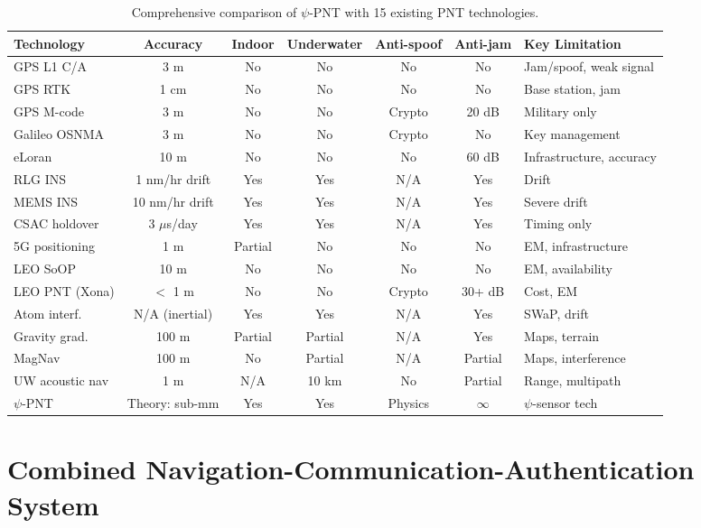 \documentclass[twocolumn,superscriptaddress,prd,nofootinbib]{revtex4-2}
\begin{document}
\begin{table}[t]
\centering
\caption{Comprehensive comparison of $\psi$-PNT with 15 existing PNT
technologies.}
\label{tab:pnt-compare}
\begin{ruledtabular}
\begin{tabular}{lcccccl}
Technology & Accuracy & Indoor & Underwater & Anti-spoof & Anti-jam & Key Limitation \\
\hline
GPS L1 C/A & 3 m & No & No & No & No & Jam/spoof, weak signal \\
GPS RTK & 1 cm & No & No & No & No & Base station, jam \\
GPS M-code & 3 m & No & No & Crypto & 20 dB & Military only \\
Galileo OSNMA & 3 m & No & No & Crypto & No & Key management \\
eLoran & 10 m & No & No & No & 60 dB & Infrastructure, accuracy \\
RLG INS & 1 nm/hr drift & Yes & Yes & N/A & Yes & Drift \\
MEMS INS & 10 nm/hr drift & Yes & Yes & N/A & Yes & Severe drift \\
CSAC holdover & 3 $\mu$s/day & Yes & Yes & N/A & Yes & Timing only \\
5G positioning & 1 m & Partial & No & No & No & EM, infrastructure \\
LEO SoOP & 10 m & No & No & No & No & EM, availability \\
LEO PNT (Xona) & $<$ 1 m & No & No & Crypto & 30+ dB & Cost, EM \\
Atom interf. & N/A (inertial) & Yes & Yes & N/A & Yes & SWaP, drift \\
Gravity grad. & 100 m & Partial & Partial & N/A & Yes & Maps, terrain \\
MagNav & 100 m & No & Partial & N/A & Partial & Maps, interference \\
UW acoustic nav & 1 m & N/A & 10 km & No & Partial & Range, multipath \\
\hline
$\psi$-PNT & Theory: sub-mm & Yes & Yes & Physics & $\infty$ & $\psi$-sensor tech \\
\end{tabular}
\end{ruledtabular}
\end{table}

\section{Combined Navigation-Communication-Authentication System}
\label{sec:combined}
\end{document}
